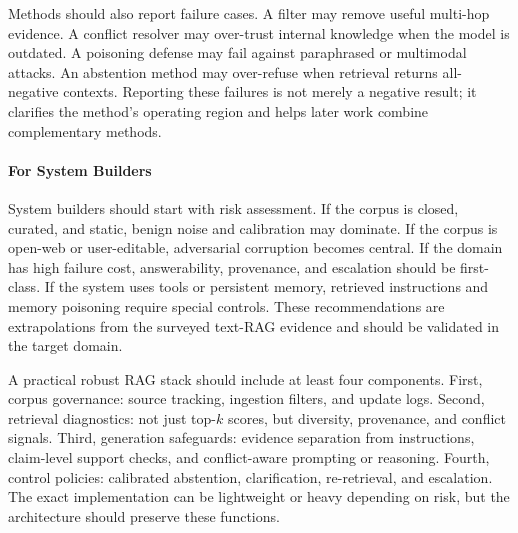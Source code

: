 Methods should also report failure cases. A filter may remove useful multi-hop evidence. A conflict resolver may over-trust internal knowledge when the model is outdated. A poisoning defense may fail against paraphrased or multimodal attacks. An abstention method may over-refuse when retrieval returns all-negative contexts. Reporting these failures is not merely a negative result; it clarifies the method's operating region and helps later work combine complementary methods.

\paragraph{For System Builders}

System builders should start with risk assessment. If the corpus is closed, curated, and static, benign noise and calibration may dominate. If the corpus is open-web or user-editable, adversarial corruption becomes central. If the domain has high failure cost, answerability, provenance, and escalation should be first-class. If the system uses tools or persistent memory, retrieved instructions and memory poisoning require special controls. These recommendations are extrapolations from the surveyed text-RAG evidence and should be validated in the target domain.

A practical robust RAG stack should include at least four components. First, corpus governance: source tracking, ingestion filters, and update logs. Second, retrieval diagnostics: not just top-$k$ scores, but diversity, provenance, and conflict signals. Third, generation safeguards: evidence separation from instructions, claim-level support checks, and conflict-aware prompting or reasoning. Fourth, control policies: calibrated abstention, clarification, re-retrieval, and escalation. The exact implementation can be lightweight or heavy depending on risk, but the architecture should preserve these functions.
